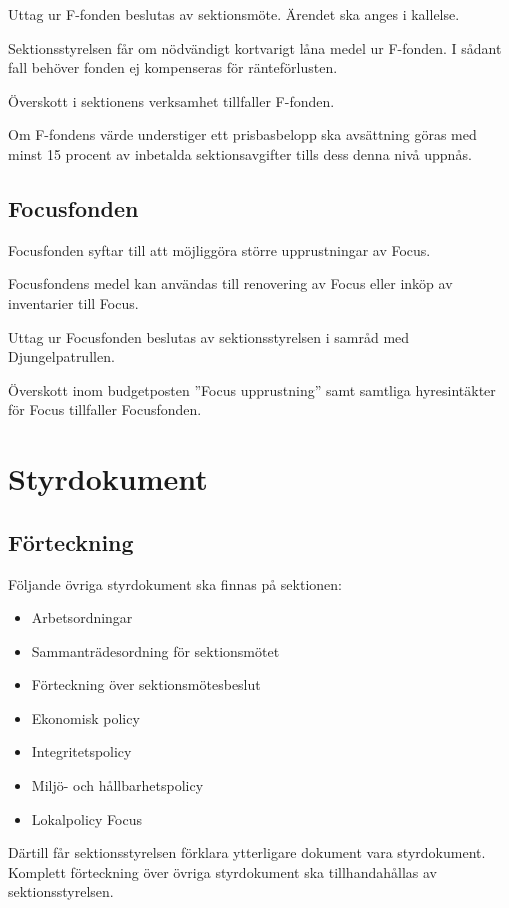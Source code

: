 \documentclass{styrdokument}
\begin{document}
\? Uttag ur F-fonden beslutas av sektionsmöte.
Ärendet ska anges i kallelse.

\? Sektionsstyrelsen får om nödvändigt kortvarigt låna medel ur F-fonden.
I sådant fall behöver fonden ej kompenseras för ränteförlusten.

\? Överskott i sektionens verksamhet tillfaller F-fonden.

\? Om F-fondens värde understiger ett prisbasbelopp ska avsättning göras med minst 15 procent av inbetalda sektionsavgifter tills dess denna nivå uppnås.

\subsection*{Focusfonden}
\? Focusfonden syftar till att möjliggöra större upprustningar av Focus.

\? Focusfondens medel kan användas till renovering av Focus eller inköp av inventarier till Focus.

\? Uttag ur Focusfonden beslutas av sektionsstyrelsen i samråd med Djungelpatrullen.

\? Överskott inom budgetposten ''Focus upprustning'' samt samtliga hyresintäkter för Focus tillfaller Focusfonden.



\section{Styrdokument}
\subsection{Förteckning}
\? Följande övriga styrdokument ska finnas på sektionen:
\begin{itemize}
    \item Arbetsordningar
    \item Sammanträdesordning för sektionsmötet
    \item Förteckning över sektionsmötesbeslut
    \item Ekonomisk policy
    \item Integritetspolicy
    \item Miljö- och hållbarhetspolicy
    \item Lokalpolicy Focus
\end{itemize}

\? Därtill får sektionsstyrelsen förklara ytterligare dokument vara styrdokument.
Komplett förteckning över övriga styrdokument ska tillhandahållas av sektionsstyrelsen.
\end{document}
